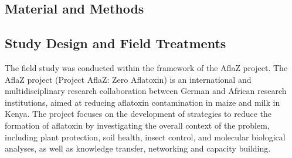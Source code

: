 \begin{refsection}
\section{Material and Methods}

\subsection{Study Design and Field Treatments}

The field study was conducted within the framework of the AflaZ project. The AflaZ project (Project AflaZ: Zero Aflatoxin) is an international and multidisciplinary research collaboration between German and African research institutions, aimed at reducing aflatoxin contamination in maize and milk in Kenya. The project focuses on the development of strategies to reduce the formation of aflatoxin by investigating the overall context of the problem, including plant protection, soil health, insect control, and molecular biological analyses, as well as knowledge transfer, networking and capacity building. 


\end{refsection}
